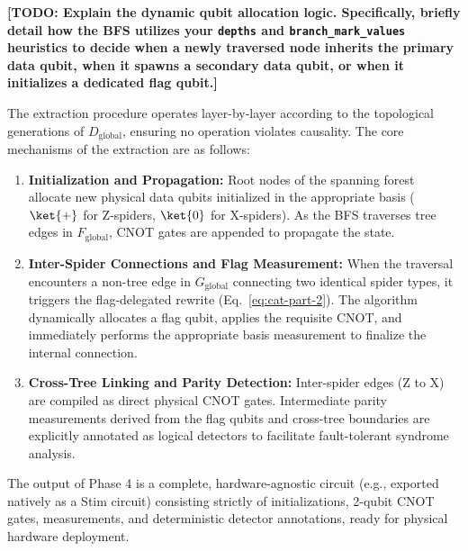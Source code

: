 \documentclass[11pt]{article}
\theoremstyle{definition}
\begin{document}
\textbf{[TODO: Explain the dynamic qubit allocation logic. Specifically, briefly detail how the BFS utilizes your \texttt{depths} and \texttt{branch\_mark\_values} heuristics to decide when a newly traversed node inherits the primary data qubit, when it spawns a secondary data qubit, or when it initializes a dedicated flag qubit.]}

The extraction procedure operates layer-by-layer according to the topological generations of $D_{\text{global}}$, ensuring no operation violates causality. The core mechanisms of the extraction are as follows:

\begin{enumerate}
    \item \textbf{Initialization and Propagation:} Root nodes of the spanning forest allocate new physical data qubits initialized in the appropriate basis ($\ket{+}$ for Z-spiders, $\ket{0}$ for X-spiders). As the BFS traverses tree edges in $F_{\text{global}}$, CNOT gates are appended to propagate the state.
    \item \textbf{Inter-Spider Connections and Flag Measurement:} When the traversal encounters a non-tree edge in $G_{\text{global}}$ connecting two identical spider types, it triggers the flag-delegated rewrite (Eq.~\ref{eq:cat-part-2}). The algorithm dynamically allocates a flag qubit, applies the requisite CNOT, and immediately performs the appropriate basis measurement to finalize the internal connection.
    \item \textbf{Cross-Tree Linking and Parity Detection:} Inter-spider edges (Z to X) are compiled as direct physical CNOT gates. Intermediate parity measurements derived from the flag qubits and cross-tree boundaries are explicitly annotated as logical detectors to facilitate fault-tolerant syndrome analysis.
\end{enumerate}

The output of Phase 4 is a complete, hardware-agnostic circuit (e.g., exported natively as a Stim circuit) consisting strictly of initializations, 2-qubit CNOT gates, measurements, and deterministic detector annotations, ready for physical hardware deployment.

\fi
\end{document}
